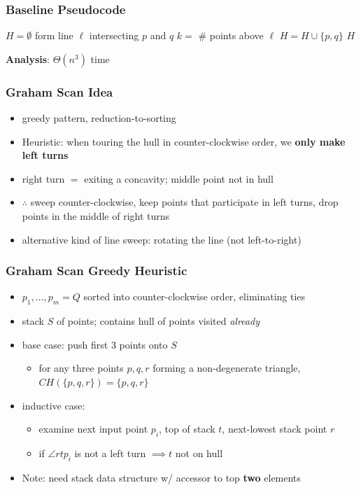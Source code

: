 \documentclass{beamer}
\begin{document}
\begin{frame} \frametitle{Baseline Pseudocode}
  {\small
\begin{algorithmic}[1]
    \State $H=\emptyset$
      \State form line $\ell$ intersecting $p$ and $q$
      \State $k = $ \# points above $\ell$
        \State $H = H \cup \{p, q\}$
      \EndIf
    \EndFor
    \State \Return $H$
  \EndFunction
\end{algorithmic}
}

\textbf{Analysis}: $\Theta(n^3)$ time
\end{frame}

\begin{frame} \frametitle{Graham Scan Idea}
\begin{itemize}
  \item greedy pattern, reduction-to-sorting
  \item Heuristic: when touring the hull in counter-clockwise order, we
    \textbf{only make left turns}
  \item right turn $=$ exiting a concavity; middle point not in hull
  \item $\therefore$ sweep counter-clockwise, keep points that participate in left
    turns, drop points in the middle of right turns
  \item alternative kind of line sweep: rotating the line (not left-to-right)
\end{itemize}
\end{frame}

\begin{frame} \frametitle{Graham Scan Greedy Heuristic}
\begin{itemize}
  \item $p_1, \ldots, p_m = Q$ sorted into counter-clockwise order, eliminating ties
  \item stack $S$ of points; contains hull of points visited \emph{already}
  \item base case: push first 3 points onto $S$
  \begin{itemize}
    \item for any three points $p, q, r$ forming a non-degenerate triangle,
      $CH(\{p, q, r\}) = \{p, q, r\}$
    \end{itemize}
  \item inductive case:
    \begin{itemize}
      \item examine next input point $p_i$, top of stack $t$, next-lowest stack point $r$
      \item if $\angle r t p_i$ is not a left turn $\implies t$ not on hull
    \end{itemize}
  \item Note: need stack data structure w/ accessor to top \textbf{two} elements
  \end{itemize}
\end{frame}
\end{document}
